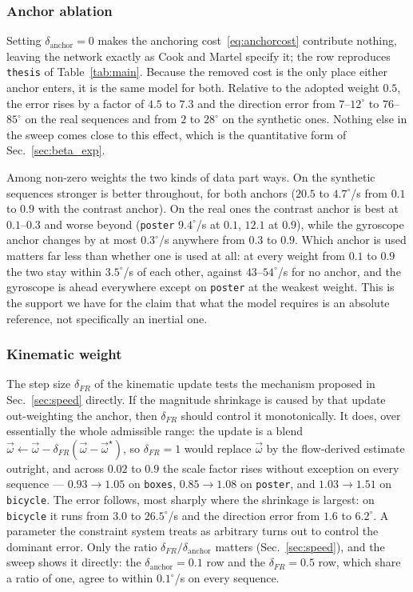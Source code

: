 \documentclass[journal]{IEEEtran}
\newcommand{\wvec}{\vec{\omega}}
\begin{document}
\subsubsection{Anchor ablation}
Setting $\delta_{\text{anchor}} = 0$ makes the anchoring
cost~\eqref{eq:anchorcost} contribute nothing, leaving the network exactly as
Cook and Martel specify it; the row reproduces \texttt{thesis} of
Table~\ref{tab:main}. Because the removed cost is the only place either anchor
enters, it is the same model for both. Relative to the adopted weight $0.5$,
the error rises by a factor of $4.5$ to $7.3$ and the direction error from
$7$--$12^\circ$ to $76$--$85^\circ$ on the real sequences and from $2$ to
$28^\circ$ on the synthetic ones. Nothing else in the sweep comes close to
this effect, which is the quantitative form of Sec.~\ref{sec:beta_exp}.

Among non-zero weights the two kinds of data part ways. On the synthetic
sequences stronger is better throughout, for both anchors ($20.5$ to
$4.7^\circ$/s from $0.1$ to $0.9$ with the contrast anchor). On the real ones
the contrast anchor is best at $0.1$--$0.3$ and worse beyond (\texttt{poster}
$9.4^\circ$/s at $0.1$, $12.1$ at $0.9$), while the gyroscope anchor changes by
at most $0.3^\circ$/s anywhere from $0.3$ to $0.9$. Which anchor is used
matters far less than whether one is used at all: at every weight from $0.1$
to $0.9$ the two stay within $3.5^\circ$/s of each other, against
$43$--$54^\circ$/s for no anchor, and the gyroscope is ahead everywhere except
on \texttt{poster} at the weakest weight. This is the support we have for the
claim that what the model requires is an absolute reference, not specifically
an inertial one.

\subsubsection{Kinematic weight}
The step size $\delta_{F\!R}$ of the kinematic update tests the mechanism
proposed in Sec.~\ref{sec:speed} directly. If the magnitude shrinkage is caused
by that update out-weighting the anchor, then $\delta_{F\!R}$ should control it
monotonically. It does, over essentially the whole admissible range: the update
is a blend $\wvec \leftarrow \wvec - \delta_{F\!R}(\wvec - \wvec^\star)$, so
$\delta_{F\!R} = 1$ would replace $\wvec$ by the flow-derived estimate outright,
and across $0.02$ to $0.9$ the scale factor rises without exception on every
sequence --- $0.93 \rightarrow 1.05$ on \texttt{boxes}, $0.85 \rightarrow 1.08$
on \texttt{poster}, and $1.03 \rightarrow 1.51$ on \texttt{bicycle}. The error
follows, most sharply where the shrinkage is largest: on \texttt{bicycle} it
runs from $3.0$ to $26.5^\circ$/s and the direction error from $1.6$ to
$6.2^\circ$. A parameter the constraint system treats as arbitrary turns out to
control the dominant error. Only the ratio $\delta_{F\!R}/\delta_{\text{anchor}}$
matters (Sec.~\ref{sec:speed}), and the sweep shows it directly: the
$\delta_{\text{anchor}} = 0.1$ row and the $\delta_{F\!R} = 0.5$ row, which share
a ratio of one, agree to within $0.1^\circ$/s on every sequence.
\end{document}
